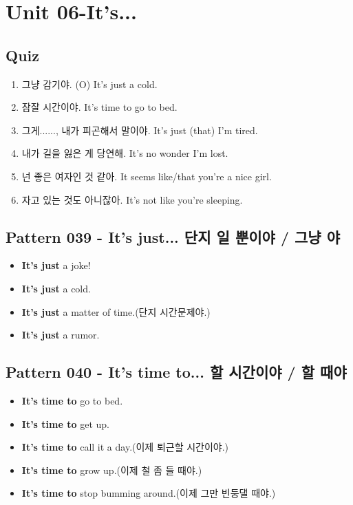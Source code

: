 \documentclass[11pt]{oblivoir}
\begin{document}
\section{Unit 06-It's...}
\subsection{Quiz}
\begin{enumerate}
  \color{black} \item 그냥 감기야. (O)
    \color{light-gray} It's just a cold.
  \color{black} \item 잠잘 시간이야.
    \color{light-gray} It's time to go to bed.
  \color{black} \item 그게......, 내가 피곤해서 말이야.
    \color{light-gray} It's just (that) I'm tired.
  \color{black} \item 내가 길을 잃은 게 당연해.
    \color{light-gray} It's no wonder I'm lost.
  \color{black} \item 넌 좋은 여자인 것 같아.
    \color{light-gray} It seems like/that you're a nice girl.
  \color{black} \item 자고 있는 것도 아니잖아.
    \color{light-gray} It's not like you're sleeping.
\end{enumerate}

\subsection{Pattern 039 - It's just... 단지 \texttildelow 일 뿐이야 / 그냥 \texttildelow 야}
\begin{itemize}
  \item \textbf{It's just} a joke!
  \item \textbf{It's just} a cold.
  \item \textbf{It's just} a matter of time.(단지 시간문제야.)
  \item \textbf{It's just} a rumor.
\end{itemize}

\subsection{Pattern 040 - It's time to... \texttildelow 할 시간이야 / \texttildelow 할 때야}
\begin{itemize}
  \item \textbf{It's time to} go to bed.
  \item \textbf{It's time to} get up.
  \item \textbf{It's time to} call it a day.(이제 퇴근할 시간이야.)
  \item \textbf{It's time to} grow up.(이제 철 좀 들 때야.)
  \item \textbf{It's time to} stop bumming around.(이제 그만 빈둥댈 때야.)
\end{itemize}
\end{document}
